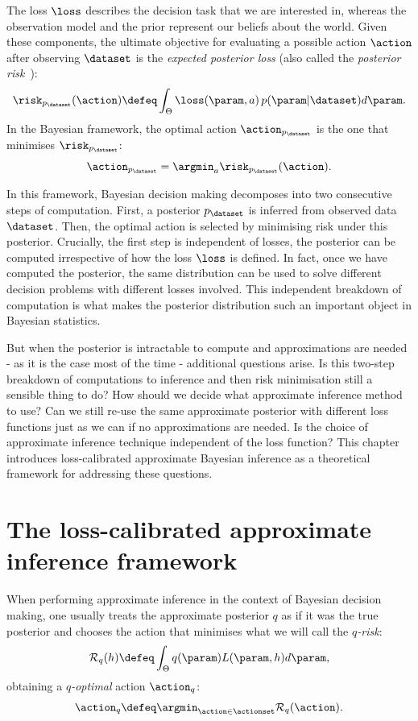 The loss $\loss$ describes the decision task that we are interested in, whereas the observation model and the prior represent our beliefs about the world. Given these components, the ultimate objective for evaluating a possible action $\action$ after observing $\dataset$ is the \emph{expected posterior loss} (also called the \emph{posterior risk}~\citep{schervish95theory}):
%
\begin{equation}
	\risk_{p_\dataset}(\action) \defeq \int_\Theta \loss(\param, a) \, p(\param|\dataset) d\param.
\end{equation}
%
In the Bayesian framework, the optimal action $\action_{p_\dataset}$ is the one that minimises $\risk_{p_\dataset}$:
%
\begin{equation}
	\action_{p_\dataset} = \argmin_{a} \risk_{p_\dataset}(\action).
\end{equation}

In this framework, Bayesian decision making decomposes into two consecutive steps of computation. First, a posterior $p_\dataset$ is inferred from observed data $\dataset$. Then, the optimal action is selected by minimising risk under this posterior. Crucially, the first step is independent of losses, the posterior can be computed irrespective of how the loss $\loss$ is defined. In fact, once we have computed the posterior, the same distribution can be used to solve different decision problems with different losses involved. This independent breakdown of computation is what makes the posterior distribution such an important object in Bayesian statistics.

But when the posterior is intractable to compute and approximations are needed - as it is the case most of the time - additional questions arise. Is this two-step breakdown of computations to inference and then risk minimisation still a sensible thing to do? How should we decide what approximate inference method to use? Can we still re-use the same approximate posterior with different loss functions just as we can if no approximations are needed. Is the choice of approximate inference technique independent of the loss function? This chapter introduces loss-calibrated approximate Bayesian inference as a theoretical framework for addressing these questions.

\section{The loss-calibrated approximate inference framework}

When performing approximate inference in the context of Bayesian decision making, one usually treats the approximate posterior $q$ as if it was the true posterior and chooses the action that minimises what we will call the \emph{$q$-risk}:
%
\begin{equation} \label{e:q-risk}
	\mathcal{R}_q(h) \defeq \int_\Theta q(\param) L(\param,h) d\param,
\end{equation}
%
obtaining a \emph{$q$-optimal} action $\action_q$:
%
\begin{equation}
	\action_q \defeq \argmin_{\action \in \actionset} \mathcal{R}_q(\action).
\end{equation}

